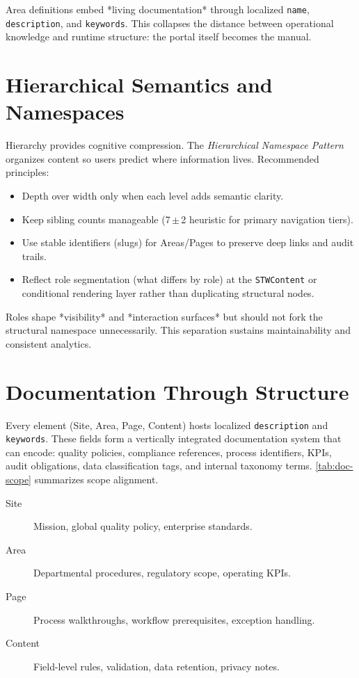Area definitions embed *living documentation* through localized \texttt{name}, \texttt{description}, and \texttt{keywords}. This collapses the distance between operational knowledge and runtime structure: the portal itself becomes the manual.

\section{Hierarchical Semantics and Namespaces}
Hierarchy provides cognitive compression. The \emph{Hierarchical Namespace Pattern} organizes content so users predict where information lives. Recommended principles:
\begin{itemize}
	\item Depth over width only when each level adds semantic clarity.
	\item Keep sibling counts manageable (7\,$\pm$\,2 heuristic for primary navigation tiers).
	\item Use stable identifiers (slugs) for Areas/Pages to preserve deep links and audit trails.
	\item Reflect role segmentation (what differs by role) at the \texttt{STWContent} or conditional rendering layer rather than duplicating structural nodes.
\end{itemize}
Roles shape *visibility* and *interaction surfaces* but should not fork the structural namespace unnecessarily. This separation sustains maintainability and consistent analytics.

\section{Documentation Through Structure}
Every \wbdl{} element (Site, Area, Page, Content) hosts localized \texttt{description} and \texttt{keywords}. These fields form a vertically integrated documentation system that can encode: quality policies, compliance references, process identifiers, KPIs, audit obligations, data classification tags, and internal taxonomy terms. \autoref{tab:doc-scope} summarizes scope alignment.

\begin{description}
	\item[Site] Mission, global quality policy, enterprise standards.
	\item[Area] Departmental procedures, regulatory scope, operating KPIs.
	\item[Page] Process walkthroughs, workflow prerequisites, exception handling.
	\item[Content] Field-level rules, validation, data retention, privacy notes.
\end{description}


